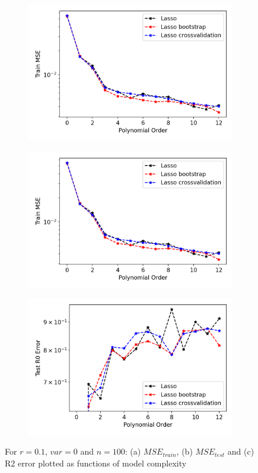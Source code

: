 \begin{figure}
\centering
\begin{subfigure}{.5\textwidth}
  \centering
  \includegraphics[width=.9\linewidth]{Images/lasso12.png}
  \caption{}
  \label{fig:lasso12}
\end{subfigure}%
\begin{subfigure}{.5\textwidth}
  \centering
  \includegraphics[width=.9\linewidth]{Images/lasso11.png}
  \caption{}
  \label{fig:lasso11}
\end{subfigure}
\begin{subfigure}{.5\textwidth}
  \centering
  \includegraphics[width=.9\linewidth]{Images/lasso13.png}
  \caption{}
  \label{fig:lasso13}
\end{subfigure}
\caption{For $r=0.1$, $var=0$ and $n=100$: (a) $MSE_{train}$, (b) $MSE_{test}$ and (c) R2 error plotted as functions of model complexity}
\label{fig:lasso_resample 100}
\end{figure}

